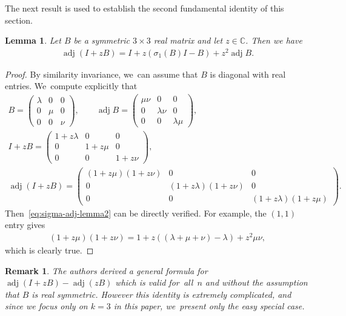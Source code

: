 \documentclass[10pt,a4paper]{amsart}
\def\C{\mathbb{C}}
\def\adj{\operatorname{adj}}
\newtheorem{Lemma}[Theorem]{Lemma}
\newtheorem{Remark}[Theorem]{Remark}}
\numberwithin{equation}{section}
\begin{document}
The next result is used to establish the second fundamental identity of this section.
\begin{Lemma} \label{lemma:sigma-adj-2}
Let $B$ be a symmetric $3 \times 3$ real matrix and let $z \in \C$. Then we have
\begin{gather} \label{eq:sigma-adj-lemma2}
\adj(I + z B) = I + z( \sigma_1(B) I - B) + z^2 \adj B.
\end{gather}
\end{Lemma}
\begin{proof}
By similarity invariance, we~can assume that $B$ is diagonal with real entries. We~compute explicitly that
\begin{gather*}
B = \begin{pmatrix} \lambda & 0 & 0 \\ 0 & \mu & 0 \\ 0 & 0 & \nu \end{pmatrix} , \qquad \adj B = \begin{pmatrix} \mu \nu & 0 & 0 \\ 0 & \lambda \nu & 0 \\ 0 & 0 & \lambda \mu \end{pmatrix} ,
\\[1ex]
I + z B = \begin{pmatrix} 1 + z \lambda & 0 & 0 \\ 0 & 1 + z \mu & 0 \\ 0 & 0 & 1 + z \nu \end{pmatrix} ,
\\[1ex]
\adj(I + z B) = \begin{pmatrix} (1 + z \mu) (1 + z \nu) & 0 & 0 \\ 0 & (1 + z \lambda) (1 + z \nu) & 0 \\ 0 & 0 & (1 + z \lambda) (1 + z \mu) \end{pmatrix} .
\end{gather*}
Then~\eqref{eq:sigma-adj-lemma2} can be directly verified. For example, the $(1,1)$ entry gives
\begin{gather*}
 (1 + z \mu) (1 + z \nu) = 1 + z ( (\lambda + \mu + \nu) - \lambda) + z^2 \mu \nu,
 \end{gather*}
which is clearly true.
\end{proof}

\begin{Remark} \label{rmk:adjugate-identity}
The authors derived a general formula for $\adj(I + z B) - \adj (z B)$ which is valid for~all~$n$ and without the assumption that $B$ is real symmetric. However this identity is extremely complicated, and since we focus only on $k=3$ in this paper, we~present only the easy special case.
\end{Remark}
\end{document}
